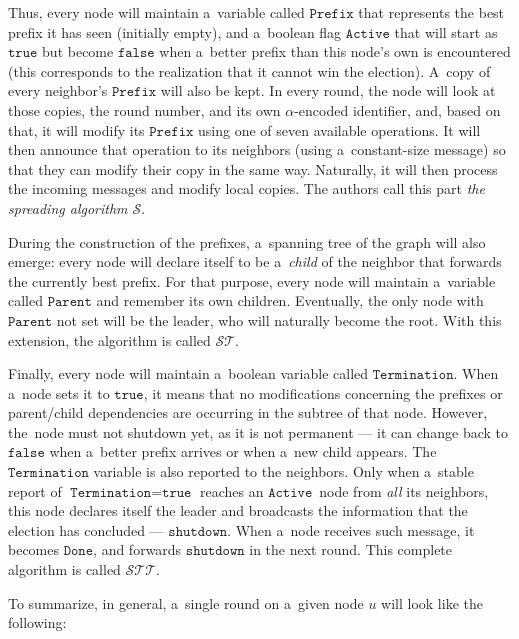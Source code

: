 \documentclass{article}
\begin{document}
Thus, every node will maintain a~variable called \(\texttt{Prefix}\) that represents the best prefix it has seen (initially empty), and a~boolean flag \(\texttt{Active}\) that will start as \(\texttt{true}\) but become \(\texttt{false}\) when a~better prefix than this node's own is encountered (this corresponds to the realization that it cannot win the election). A~copy of every neighbor's \(\texttt{Prefix}\) will also be kept. In every round, the node will look at those copies, the round number, and its own \(\alpha\)-encoded identifier, and, based on that, it will modify its \(\texttt{Prefix}\) using one of seven available operations. It will then announce that operation to its neighbors (using a~constant-size message) so that they can modify their copy in the same way. Naturally, it will then process the incoming messages and modify local copies. The authors call this part \emph{the spreading algorithm \(\mathcal{S}\)}.

During the construction of the prefixes, a~spanning tree of the graph will also emerge: every node will declare itself to be a~\emph{child} of the neighbor that forwards the currently best prefix. For that purpose, every node will maintain a~variable called \(\texttt{Parent}\) and remember its own children. Eventually, the only node with \(\texttt{Parent}\) not set will be the leader, who will naturally become the root. With this extension, the algorithm is called \(\mathcal{ST}\).

Finally, every node will maintain a~boolean variable called \(\texttt{Termination}\). When a~node sets it to \(\texttt{true}\), it means that no modifications concerning the prefixes or parent/child dependencies are occurring in the subtree of that node. However, the~node must not shutdown yet, as it is not permanent --- it can change back to \(\texttt{false}\) when a~better prefix arrives or when a~new child appears. The \(\texttt{Termination}\) variable is also reported to the neighbors. Only when a~stable report of \(\texttt{Termination} = \texttt{true}\) reaches an \(\texttt{Active}\)~node from \emph{all} its neighbors, this node declares itself the leader and broadcasts the information that the election has concluded --- \(\texttt{shutdown}\). When a~node receives such message, it becomes \(\texttt{Done}\), and forwards \(\texttt{shutdown}\) in the next round. This complete algorithm is called \(\mathcal{STT}\).

To summarize, in general, a~single round on a~given node \(u\) will look like the following:
\end{document}
